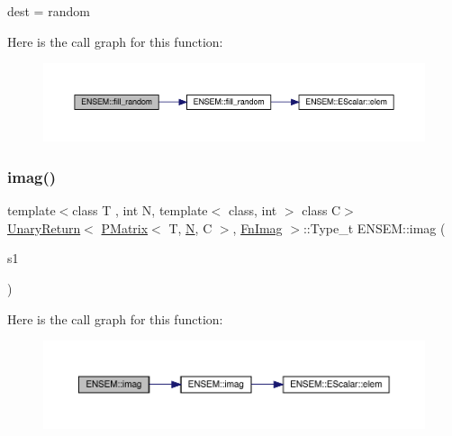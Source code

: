 dest = random 

Here is the call graph for this function\+:\nopagebreak
\begin{figure}[H]
\begin{center}
\leavevmode
\includegraphics[width=350pt]{df/d0a/group__primmatrix_gaa42f6f1f971a8fb7bf5b5b8b0a5a43ec_cgraph}
\end{center}
\end{figure}
\mbox{\label{group__primmatrix_ga0e708a122654c3ad8295f071a5857abb}} 
\subsubsection{\texorpdfstring{imag()}{imag()}}
{\footnotesize\ttfamily template$<$class T , int N, template$<$ class, int $>$ class C$>$ \\
\mbox{\hyperlink{structENSEM_1_1UnaryReturn}{Unary\+Return}}$<$ \mbox{\hyperlink{classENSEM_1_1PMatrix}{P\+Matrix}}$<$ T, \mbox{\hyperlink{adat__devel_2lib_2hadron_2operator__name__util_8cc_a7722c8ecbb62d99aee7ce68b1752f337}{N}}, C $>$, \mbox{\hyperlink{structENSEM_1_1FnImag}{Fn\+Imag}} $>$\+::Type\+\_\+t E\+N\+S\+E\+M\+::imag (\begin{DoxyParamCaption}\item[{const \mbox{\hyperlink{classENSEM_1_1PMatrix}{P\+Matrix}}$<$ T, \mbox{\hyperlink{adat__devel_2lib_2hadron_2operator__name__util_8cc_a7722c8ecbb62d99aee7ce68b1752f337}{N}}, C $>$ \&}]{s1 }\end{DoxyParamCaption})\hspace{0.3cm}{\ttfamily [inline]}}

Here is the call graph for this function\+:\nopagebreak
\begin{figure}[H]
\begin{center}
\leavevmode
\includegraphics[width=350pt]{df/d0a/group__primmatrix_ga0e708a122654c3ad8295f071a5857abb_cgraph}
\end{center}
\end{figure}
\mbox{\label{group__primmatrix_gaa17cf25ee54da2665418c0cfbccc0ae9}} 
